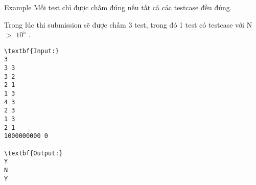Example
Mỗi test chỉ được chấm đúng nếu tất cả các testcase đều đúng.

Trong lúc thi submission sẽ được chấm 3 test, trong đó 1 test có testcase với N $>$ $10^{5}$ .
\begin{verbatim}
\textbf{Input:}
3
3 3
3 2
2 1
1 3
4 3
2 3
1 3
2 1
1000000000 0

\textbf{Output:}
Y
N
Y\end{verbatim}
